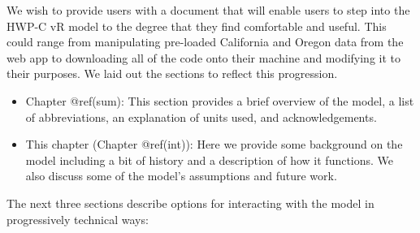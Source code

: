 \documentclass[
  openany]{book}
\providecommand{\tightlist}{%
  \setlength{\itemsep}{0pt}\setlength{\parskip}{0pt}}
\begin{document}
We wish to provide users with a document that will enable users to step
into the HWP-C vR model to the degree that they find comfortable and
useful. This could range from manipulating pre-loaded California and
Oregon data from the web app to downloading all of the code onto their
machine and modifying it to their purposes. We laid out the sections to
reflect this progression.

\begin{itemize}
\tightlist
\item
  Chapter @ref(sum): This section provides a brief overview of the
  model, a list of abbreviations, an explanation of units used, and
  acknowledgements.\\
\item
  This chapter (Chapter @ref(int)): Here we provide some background on
  the model including a bit of history and a description of how it
  functions. We also discuss some of the model's assumptions and future
  work.
\end{itemize}

The next three sections describe options for interacting with the model
in progressively technical ways:
\end{document}
